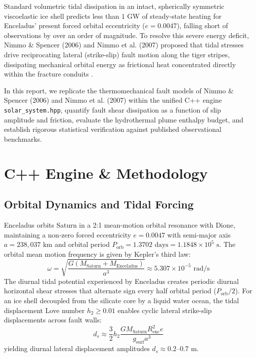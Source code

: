 \documentclass[11pt,a4paper]{article}
\begin{document}
Standard volumetric tidal dissipation in an intact, spherically symmetric viscoelastic ice shell predicts less than $1\text{ GW}$ of steady-state heating for Enceladus' present forced orbital eccentricity ($e = 0.0047$), falling short of observations by over an order of magnitude. To resolve this severe energy deficit, Nimmo \& Spencer (2006) and Nimmo et al. (2007) proposed that tidal stresses drive reciprocating lateral (strike-slip) fault motion along the tiger stripes, dissipating mechanical orbital energy as frictional heat concentrated directly within the fracture conduits \cite{nimmo2006,nimmo2007,hurford2007}.

In this report, we replicate the thermomechanical fault models of Nimmo \& Spencer (2006) and Nimmo et al. (2007) within the unified C++ engine \texttt{solar\_system.hpp}, quantify fault shear dissipation as a function of slip amplitude and friction, evaluate the hydrothermal plume enthalpy budget, and establish rigorous statistical verification against published observational benchmarks.

\section{C++ Engine \& Methodology}

\subsection{Orbital Dynamics and Tidal Forcing}
Enceladus orbits Saturn in a 2:1 mean-motion orbital resonance with Dione, maintaining a non-zero forced eccentricity $e = 0.0047$ with semi-major axis $a = 238{,}037\text{ km}$ and orbital period $P_{\text{orb}} = 1.3702\text{ days} = 1.1848 \times 10^5\text{ s}$. The orbital mean motion frequency is given by Kepler's third law:
\begin{equation}
\omega = \sqrt{\frac{G(M_{\text{Saturn}} + M_{\text{Enceladus}})}{a^3}} \approx 5.307 \times 10^{-5}\text{ rad/s}
\end{equation}
The diurnal tidal potential experienced by Enceladus creates periodic diurnal horizontal shear stresses that alternate sign every half orbital period ($P_{\text{orb}}/2$). For an ice shell decoupled from the silicate core by a liquid water ocean, the tidal displacement Love number $h_2 \ge 0.01$ enables cyclic lateral strike-slip displacements across fault walls:
\begin{equation}
d_s \approx \frac{3}{2} h_2 \frac{G M_{\text{Saturn}} R_{\text{enc}}^2 e}{g_{\text{surf}} a^3}
\end{equation}
yielding diurnal lateral displacement amplitudes $d_s \approx 0.2\text{--}0.7\text{ m}$.
\end{document}

